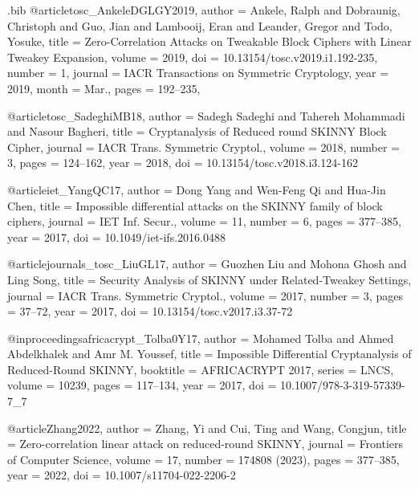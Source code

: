 \documentclass[table,aspectratio=169]{beamer}
\begin{document}
\begin{filecontents*}[overwrite]{\jobname.bib}
@article{tosc_AnkeleDGLGY2019, 
  author    = {Ankele, Ralph and Dobraunig, Christoph and Guo, Jian and Lambooij, Eran and Leander, Gregor and Todo, Yosuke}, 
  title     = {Zero-Correlation Attacks on Tweakable Block Ciphers with Linear Tweakey Expansion}, 
  volume    = {2019},
  doi       = {10.13154/tosc.v2019.i1.192-235}, 
  number    = {1}, 
  journal   = {IACR Transactions on Symmetric Cryptology}, 
  year      = {2019},
  month     = {Mar.}, 
  pages     = {192–235},
}

@article{tosc_SadeghiMB18,
  author    = {Sadegh Sadeghi and
               Tahereh Mohammadi and
               Nasour Bagheri},
  title     = {Cryptanalysis of Reduced round {SKINNY} Block Cipher},
  journal   = {{IACR} Trans. Symmetric Cryptol.},
  volume    = {2018},
  number    = {3},
  pages     = {124--162},
  year      = {2018},
  doi       = {10.13154/tosc.v2018.i3.124-162}
}

@article{iet_YangQC17,
  author    = {Dong Yang and
               Wen{-}Feng Qi and
               Hua{-}Jin Chen},
  title     = {Impossible differential attacks on the {SKINNY} family of block ciphers},
  journal   = {{IET} Inf. Secur.},
  volume    = {11},
  number    = {6},
  pages     = {377--385},
  year      = {2017},
  doi       = {10.1049/iet-ifs.2016.0488}
}

@article{journals_tosc_LiuGL17,
  author    = {Guozhen Liu and
               Mohona Ghosh and
               Ling Song},
  title     = {Security Analysis of {SKINNY} under Related-Tweakey Settings},
  journal   = {{IACR} Trans. Symmetric Cryptol.},
  volume    = {2017},
  number    = {3},
  pages     = {37--72},
  year      = {2017},
  doi       = {10.13154/tosc.v2017.i3.37-72}
}

@inproceedings{africacrypt_Tolba0Y17,
  author    = {Mohamed Tolba and
               Ahmed Abdelkhalek and
               Amr M. Youssef},
  title     = {Impossible Differential Cryptanalysis of Reduced-Round {SKINNY}},
  booktitle = {{AFRICACRYPT} 2017},
  series    = {LNCS},
  volume    = {10239},
  pages     = {117--134},
  year      = {2017},
  doi       = {10.1007/978-3-319-57339-7_7}
}

@article{Zhang2022,
  author    = {Zhang, Yi and
               Cui, Ting and
               Wang, Congjun},
  title     = {{Zero-correlation} linear attack on reduced-round {SKINNY}},
  journal   = {Frontiers of Computer Science},
  volume    = {17},
  number    = {174808 (2023)},
  pages     = {377--385},
  year      = {2022},
  doi       = {10.1007/s11704-022-2206-2}
}


\end{filecontents*}
\end{document}
